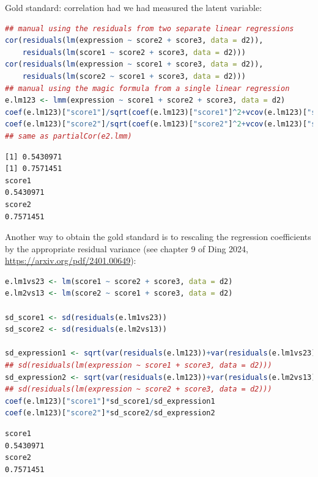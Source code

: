 \documentclass{article}
\begin{document}
Gold standard: correlation had we had measured the latent variable:
\begin{lstlisting}[language=r,numbers=none]
## manual using the residuals from two separate linear regressions
cor(residuals(lm(expression ~ score2 + score3, data = d2)),
    residuals(lm(score1 ~ score2 + score3, data = d2)))
cor(residuals(lm(expression ~ score1 + score3, data = d2)),
    residuals(lm(score2 ~ score1 + score3, data = d2)))
## manual using the magic formula from a single linear regression
e.lm123 <- lmm(expression ~ score1 + score2 + score3, data = d2)
coef(e.lm123)["score1"]/sqrt(coef(e.lm123)["score1"]^2+vcov(e.lm123)["score1","score1"]*df.residual(e.lm123))
coef(e.lm123)["score2"]/sqrt(coef(e.lm123)["score2"]^2+vcov(e.lm123)["score2","score2"]*df.residual(e.lm123))
## same as partialCor(e2.lmm)
\end{lstlisting}

\label{}
\begin{verbatim}
[1] 0.5430971
[1] 0.7571451
score1 
0.5430971
score2 
0.7571451
\end{verbatim}


Another way to obtain the gold standard is to rescaling the regression
coefficients by the appropriate residual variance (see chapter 9 of
Ding 2024, \url{https://arxiv.org/pdf/2401.00649}):
\begin{lstlisting}[language=r,numbers=none]
e.lm1vs23 <- lm(score1 ~ score2 + score3, data = d2)
e.lm2vs13 <- lm(score2 ~ score1 + score3, data = d2)

sd_score1 <- sd(residuals(e.lm1vs23))
sd_score2 <- sd(residuals(e.lm2vs13))

sd_expression1 <- sqrt(var(residuals(e.lm123))+var(residuals(e.lm1vs23))*coef(e.lm123)["score1"]^2)
## sd(residuals(lm(expression ~ score1 + score3, data = d2)))
sd_expression2 <- sqrt(var(residuals(e.lm123))+var(residuals(e.lm2vs13))*coef(e.lm123)["score2"]^2)
## sd(residuals(lm(expression ~ score2 + score3, data = d2)))
coef(e.lm123)["score1"]*sd_score1/sd_expression1
coef(e.lm123)["score2"]*sd_score2/sd_expression2
\end{lstlisting}

\label{}
\begin{verbatim}
score1 
0.5430971
score2 
0.7571451
\end{verbatim}
\end{document}
